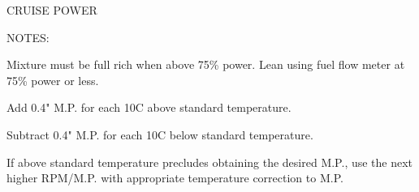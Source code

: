 \documentclass[twoside,titlepage,chapterprefix,10pt]{scrbook}
\newenvironment{perfhdr}
 {\sffamily\huge\begin{center}}
 {\end{center}\vspace{5ex}\normalfont\normalsize}
\begin{document}
\begin{sidewaysfigure}[htb]
\begin{center}
\begin{perfhdr}CRUISE POWER
\end{perfhdr}
\vspace{.2in}
\begin{minipage}{8.56in}
\begin{minipage}{5in}
NOTES:
\begin{enumerate*}
\item Mixture must be full rich when above 75\% power. Lean using fuel flow meter at 75\% power or less.
\item Add 0.4" M.P. for each 10\textdegree C above standard temperature.  
\item Subtract 0.4" M.P. for each 10\textdegree C below standard temperature.
\item If above standard temperature precludes obtaining the desired M.P., use the next higher RPM/M.P. with appropriate temperature correction to M.P.
\end{enumerate*}


\end{minipage}
\end{minipage}
\end{center}
\end{sidewaysfigure}
\end{document}
